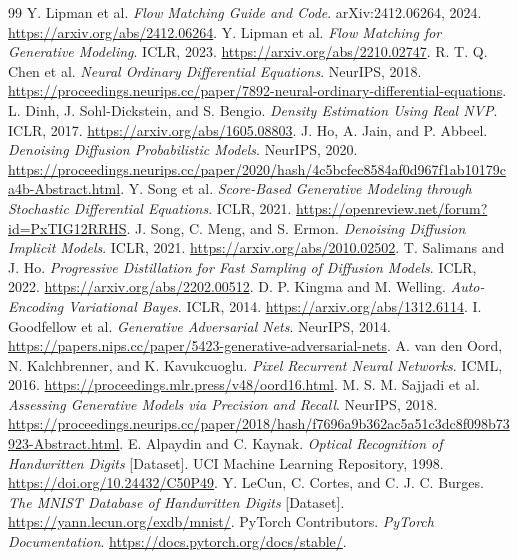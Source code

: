 \documentclass[11pt]{article}
\begin{document}
\clearpage
\begin{thebibliography}{99}
 Y. Lipman et al. \emph{Flow Matching Guide and Code}.
arXiv:2412.06264, 2024. \url{https://arxiv.org/abs/2412.06264}.
 Y. Lipman et al. \emph{Flow Matching for Generative
Modeling}. ICLR, 2023. \url{https://arxiv.org/abs/2210.02747}.
 R. T. Q. Chen et al. \emph{Neural Ordinary
Differential Equations}. NeurIPS, 2018.
\url{https://proceedings.neurips.cc/paper/7892-neural-ordinary-differential-equations}.
 L. Dinh, J. Sohl-Dickstein, and S. Bengio.
\emph{Density Estimation Using Real NVP}. ICLR, 2017.
\url{https://arxiv.org/abs/1605.08803}.
 J. Ho, A. Jain, and P. Abbeel. \emph{Denoising Diffusion
Probabilistic Models}. NeurIPS, 2020.
\url{https://proceedings.neurips.cc/paper/2020/hash/4c5bcfec8584af0d967f1ab10179ca4b-Abstract.html}.
 Y. Song et al. \emph{Score-Based Generative Modeling
through Stochastic Differential Equations}. ICLR, 2021.
\url{https://openreview.net/forum?id=PxTIG12RRHS}.
 J. Song, C. Meng, and S. Ermon. \emph{Denoising Diffusion
Implicit Models}. ICLR, 2021. \url{https://arxiv.org/abs/2010.02502}.
 T. Salimans and J. Ho. \emph{Progressive
Distillation for Fast Sampling of Diffusion Models}. ICLR, 2022.
\url{https://arxiv.org/abs/2202.00512}.
 D. P. Kingma and M. Welling. \emph{Auto-Encoding
Variational Bayes}. ICLR, 2014. \url{https://arxiv.org/abs/1312.6114}.
 I. Goodfellow et al. \emph{Generative Adversarial
Nets}. NeurIPS, 2014.
\url{https://papers.nips.cc/paper/5423-generative-adversarial-nets}.
 A. van den Oord, N. Kalchbrenner, and K. Kavukcuoglu.
\emph{Pixel Recurrent Neural Networks}. ICML, 2016.
\url{https://proceedings.mlr.press/v48/oord16.html}.
 M. S. M. Sajjadi et al. \emph{Assessing
Generative Models via Precision and Recall}. NeurIPS, 2018.
\url{https://proceedings.neurips.cc/paper/2018/hash/f7696a9b362ac5a51c3dc8f098b73923-Abstract.html}.
 E. Alpaydin and C. Kaynak. \emph{Optical Recognition of
Handwritten Digits} [Dataset]. UCI Machine Learning Repository, 1998.
\url{https://doi.org/10.24432/C50P49}.
 Y. LeCun, C. Cortes, and C. J. C. Burges.
\emph{The MNIST Database of Handwritten Digits} [Dataset].
\url{https://yann.lecun.org/exdb/mnist/}.
 PyTorch Contributors. \emph{PyTorch Documentation}.
\url{https://docs.pytorch.org/docs/stable/}.
\end{thebibliography}
\end{document}

